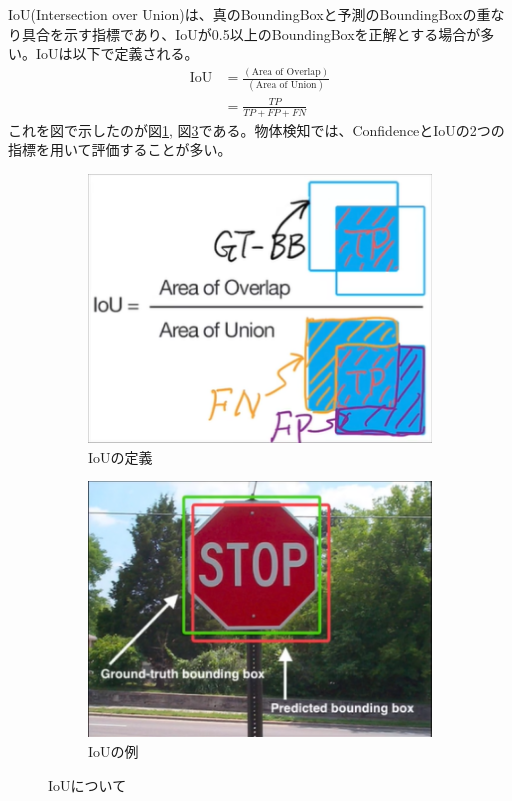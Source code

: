 \documentclass{ltjsarticle}
\begin{document}
IoU(Intersection over Union)は、真のBoundingBoxと予測のBoundingBoxの重なり具合を示す指標であり、IoUが0.5以上のBoundingBoxを正解とする場合が多い。IoUは以下で定義される。
\begin{align}
  \text{IoU} &= \frac{(\text{Area of Overlap})}{(\text{Area of Union})}\\
  &= \frac{TP}{TP+FP+FN}
\end{align}
これを図で示したのが図\ref{fig:IoU}, 図\ref{fig:IoU_example}である。物体検知では、ConfidenceとIoUの2つの指標を用いて評価することが多い。
\begin{figure}[htbp]
  \centering
  \begin{subfigure}[b]{0.45\textwidth}
    \centering
    \includegraphics[width=\textwidth]{./capture/IoU.png}
    \caption{IoUの定義}
    \label{fig:IoU}
  \end{subfigure}
  \hfill
  \begin{subfigure}[b]{0.45\textwidth}
    \centering
    \includegraphics[width=\textwidth]{./capture/IoU_example.png}
    \caption{IoUの例}
    \label{fig:IoU_example}
  \end{subfigure}
  \caption{IoUについて}
\end{figure}
\end{document}

